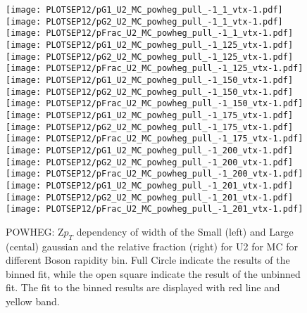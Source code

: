 \documentclass[41pt,a4paper,oneside]{report}
\begin{document}
\begin{figure}[h!]
  \begin{center}
    \texttt{[image: PLOTSEP12/pG1\_U2\_MC\_powheg\_pull\_-1\_1\_vtx-1.pdf]}
    \texttt{[image: PLOTSEP12/pG2\_U2\_MC\_powheg\_pull\_-1\_1\_vtx-1.pdf]}
    \texttt{[image: PLOTSEP12/pFrac\_U2\_MC\_powheg\_pull\_-1\_1\_vtx-1.pdf]} 
    \texttt{[image: PLOTSEP12/pG1\_U2\_MC\_powheg\_pull\_-1\_125\_vtx-1.pdf]}
    \texttt{[image: PLOTSEP12/pG2\_U2\_MC\_powheg\_pull\_-1\_125\_vtx-1.pdf]}
    \texttt{[image: PLOTSEP12/pFrac\_U2\_MC\_powheg\_pull\_-1\_125\_vtx-1.pdf]} 
    \texttt{[image: PLOTSEP12/pG1\_U2\_MC\_powheg\_pull\_-1\_150\_vtx-1.pdf]}
    \texttt{[image: PLOTSEP12/pG2\_U2\_MC\_powheg\_pull\_-1\_150\_vtx-1.pdf]}
    \texttt{[image: PLOTSEP12/pFrac\_U2\_MC\_powheg\_pull\_-1\_150\_vtx-1.pdf]} 
    \texttt{[image: PLOTSEP12/pG1\_U2\_MC\_powheg\_pull\_-1\_175\_vtx-1.pdf]}
    \texttt{[image: PLOTSEP12/pG2\_U2\_MC\_powheg\_pull\_-1\_175\_vtx-1.pdf]}
    \texttt{[image: PLOTSEP12/pFrac\_U2\_MC\_powheg\_pull\_-1\_175\_vtx-1.pdf]} 
    \texttt{[image: PLOTSEP12/pG1\_U2\_MC\_powheg\_pull\_-1\_200\_vtx-1.pdf]}
    \texttt{[image: PLOTSEP12/pG2\_U2\_MC\_powheg\_pull\_-1\_200\_vtx-1.pdf]}
    \texttt{[image: PLOTSEP12/pFrac\_U2\_MC\_powheg\_pull\_-1\_200\_vtx-1.pdf]} 
    \texttt{[image: PLOTSEP12/pG1\_U2\_MC\_powheg\_pull\_-1\_201\_vtx-1.pdf]}
    \texttt{[image: PLOTSEP12/pG2\_U2\_MC\_powheg\_pull\_-1\_201\_vtx-1.pdf]}
    \texttt{[image: PLOTSEP12/pFrac\_U2\_MC\_powheg\_pull\_-1\_201\_vtx-1.pdf]} 
    \caption{POWHEG: Z$p_{T}$ dependency of width of the Small (left) and Large (cental) gaussian and the relative fraction (right) for U2 for MC for different Boson rapidity bin. Full Circle indicate the results of the binned fit, while the open square indicate the result of the unbinned fit. The fit to the binned results are displayed with red line and yellow band.
\newline
}
    \label{fig:SmallLargeU2POW}
  \end{center}
\end{figure}
\end{document}
